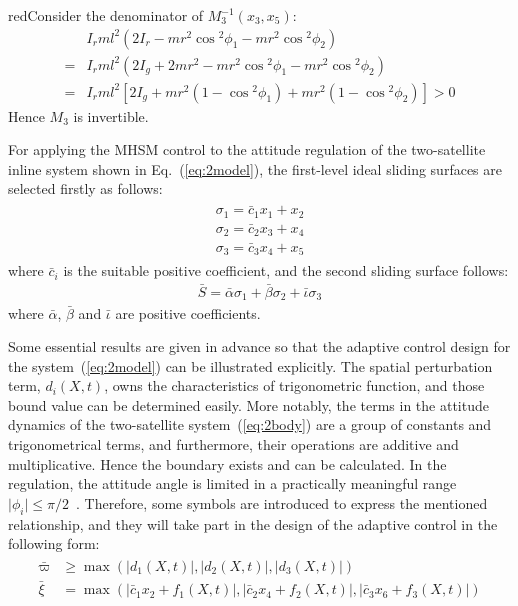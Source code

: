 \begin{color}{red}Consider the denominator of $M_3^{-1}(x_3,x_5)$:
\begin{align*}
&I_rml^2(2I_r-mr^2\cos{^2\phi_1}-mr^2\cos{^2\phi_2})\\
=& I_rml^2(2I_g+2mr^2-mr^2\cos{^2\phi_1}-mr^2\cos{^2\phi_2})\\
=& I_rml^2[2I_g+mr^2(1-\cos{^2\phi_1})+mr^2(1-\cos{^2\phi_2})]>0
\end{align*}
Hence $M_{3}$ is invertible.\end{color}\par
For applying the MHSM control to the attitude regulation of the two-satellite inline system shown in Eq.~(\ref{eq:2model}), the first-level ideal sliding surfaces are selected firstly as follows:
\begin{align}
\begin{split}
\sigma_1 = \bar{c}_1x_1+x_2\\
\sigma_2 = \bar{c}_2x_3+x_4\\
\sigma_3 = \bar{c}_3x_4+x_5
\end{split}\label{eq:sigma123}
\end{align}
where $\bar{c}_i$ is the suitable positive coefficient, and the second sliding surface follows:
\begin{align}
\bar{S} = \bar{\alpha}\sigma_1+ \bar{\beta}\sigma_2+\bar{\iota}\sigma_3\label{eq:bar S}
\end{align}
where $\bar{\alpha}$, $\bar{\beta}$ and $\bar{\iota}$ are positive coefficients.
\begin{remark}
Some essential results are given in advance so that the adaptive control design for the system~(\ref{eq:2model}) can be illustrated explicitly. The spatial perturbation term, $d_i(X,t)$, owns the characteristics of trigonometric function, and those bound value can be determined easily. More notably, the terms in the attitude dynamics of the two-satellite system~(\ref{eq:2body}) are a group of constants and trigonometrical terms, and furthermore, their operations are additive and multiplicative. Hence the boundary exists and can be calculated. In the regulation, the attitude angle is limited in a practically meaningful range $\vert \phi_i\vert\le\pi/2$~\cite{chung2008propellant2}. Therefore, some symbols are introduced to express the mentioned relationship, and they will take part in the design of the adaptive control in the following form:\label{rem:2}
\begin{align}
\begin{split}
\bar\varpi &\ge \max(\vert d_1(X,t)\vert,\vert d_2(X,t)\vert,\vert d_3(X,t)\vert)\\
\bar\xi &=  \max(\vert \bar c_1x_2 + f_1(X,t)\vert,\vert \bar c_2x_4 + f_2(X,t)\vert,\vert \bar c_3x_6 + f_3(X,t)\vert)
\end{split}
\end{align}
\end{remark}\par
